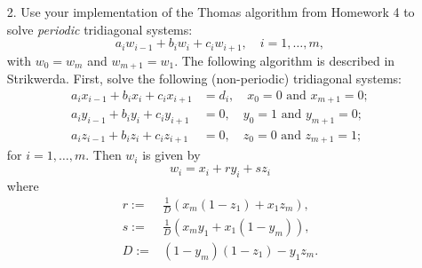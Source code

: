 \documentclass{article}
\begin{document}
\begin{itemize}
\item[2.] Use your implementation of the Thomas algorithm from Homework 4 to solve \emph{periodic} tridiagonal systems:
\begin{equation*}
a_i w_{i-1} + b_i w_i + c_i w_{i+1}, \quad i = 1, \dotsc, m,
\end{equation*}
with $w_0 = w_m$ and $w_{m+1} = w_1$. The following algorithm is described in Strikwerda. First, solve the following (non-periodic) tridiagonal systems:
\begin{align*}
a_i x_{i-1} + b_i x_i + c_i x_{i+1} & = d_i, \quad x_0 = 0 \text{ and } x_{m+1} = 0; \\
a_i y_{i-1} + b_i y_i + c_i y_{i+1} & = 0,   \quad y_0 = 1 \text{ and } y_{m+1} = 0; \\
a_i z_{i-1} + b_i z_i + c_i z_{i+1} & = 0,   \quad z_0 = 0 \text{ and } z_{m+1} = 1;
\end{align*}
for $i = 1, \dotsc, m$. Then $w_i$ is given by
\begin{equation*}
w_i = x_i + r y_i + s z_i
\end{equation*}
where
\begin{align*}
r := {} & \frac{1}{D} \left( x_m \left( 1 - z_1 \right) + x_1 z_m \right), \\
s := {} &  \frac{1}{D} \left( x_m y_1 + x_1 \left( 1 - y_m \right) \right), \\
D := {} & \left( 1 - y_m \right) \left( 1 - z_1 \right) - y_1 z_m.
\end{align*}

\end{itemize}
\end{document}

